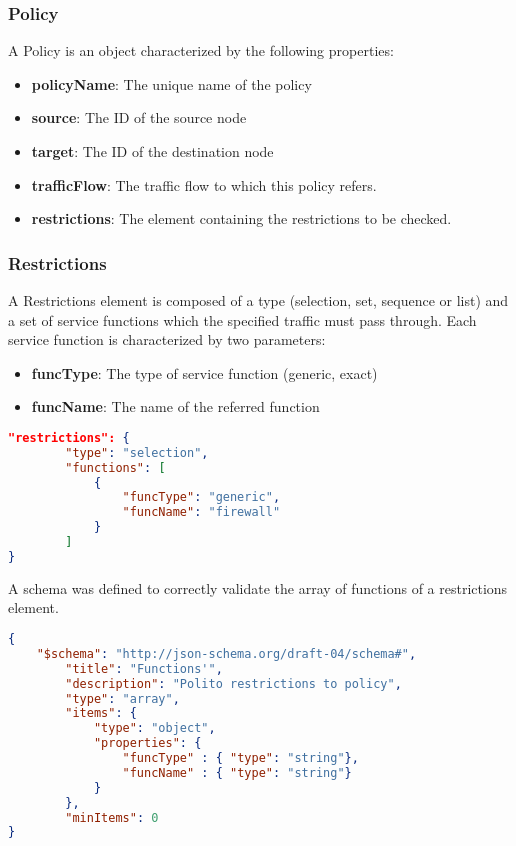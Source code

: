 \subsubsection*{Policy}
A Policy is an object characterized by the following properties:
\begin{itemize}
 \item \textbf{policyName}: The unique name of the policy
 \item \textbf{source}: The ID of the source node
 \item \textbf{target}: The ID of the destination node  
\item \textbf{trafficFlow}: The traffic flow to which this policy refers.
 \item \textbf{restrictions}: The element containing the restrictions to be checked.
\end{itemize}

\subsubsection*{Restrictions}
A Restrictions element is composed of a type (selection, set, sequence or list) and a set of service functions which the specified traffic must pass through. Each service function is characterized by two parameters:
\begin{itemize}
 \item \textbf{funcType}: The type of service function (generic, exact)
 \item \textbf{funcName}: The name of the referred function
\end{itemize}

\begin{lstlisting}[language=JSON, caption=Restrictions Example]
"restrictions": {
        "type": "selection",
        "functions": [
            {
            	"funcType": "generic",
            	"funcName": "firewall"
            }
        ]
}
\end{lstlisting}

A schema was defined to correctly validate the array of functions of a restrictions element.

\begin{lstlisting}[language=JSON, caption=Restrictions' functions schema]
{
	"$schema": "http://json-schema.org/draft-04/schema#",
    	"title": "Functions'",
    	"description": "Polito restrictions to policy",
    	"type": "array",
		"items": {
			"type": "object",
			"properties": {
				"funcType" : { "type": "string"},
				"funcName" : { "type": "string"}
			}
		},
    	"minItems": 0
}
\end{lstlisting}


